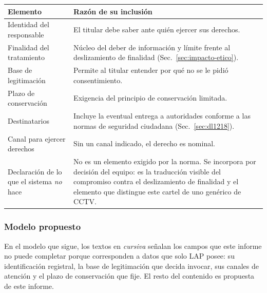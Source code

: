 \begin{center}
\small
\begin{tabularx}{\linewidth}{@{}L{4.2cm}Y@{}}
\toprule
\textbf{Elemento} & \textbf{Razón de su inclusión} \\
\midrule
Identidad del responsable &
El titular debe saber ante quién ejercer sus derechos. \\
\addlinespace
Finalidad del tratamiento &
Núcleo del deber de información y límite frente al deslizamiento de
finalidad (Sec.~\ref{sec:impacto-etico}). \\
\addlinespace
Base de legitimación &
Permite al titular entender por qué no se le pidió consentimiento. \\
\addlinespace
Plazo de conservación &
Exigencia del principio de conservación limitada. \\
\addlinespace
Destinatarios &
Incluye la eventual entrega a autoridades conforme a las normas de
seguridad ciudadana (Sec.~\ref{sec:dl1218}). \\
\addlinespace
Canal para ejercer derechos &
Sin un canal indicado, el derecho es nominal. \\
\addlinespace
Declaración de lo que el sistema \emph{no} hace &
No es un elemento exigido por la norma. Se incorpora por decisión del equipo: es la traducción visible del compromiso contra el
deslizamiento de finalidad y el elemento que distingue este cartel de
uno genérico de CCTV. \\
\bottomrule
\end{tabularx}
\end{center}

\subsubsection{Modelo propuesto}

En el modelo que sigue, los textos en \emph{cursiva} señalan los campos
que este informe no puede completar porque corresponden a datos que solo
LAP posee: su identificación registral, la base de legitimación que
decida invocar, sus canales de atención y el plazo de conservación que
fije. El resto del contenido es propuesta de este informe.

